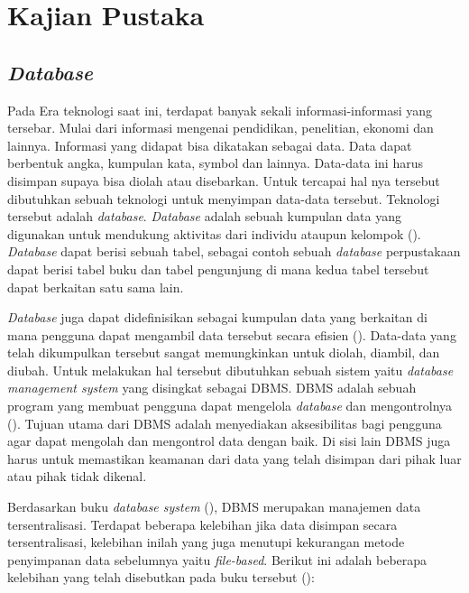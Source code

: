 
\chapter{Kajian Pustaka}

\section{\emph{Database}}

Pada Era teknologi saat ini, terdapat banyak sekali informasi-informasi 
yang tersebar. Mulai dari informasi mengenai pendidikan, penelitian, 
ekonomi dan lainnya. Informasi yang didapat bisa dikatakan sebagai data. 
Data dapat berbentuk angka, kumpulan kata, symbol dan lainnya. Data-data 
ini harus disimpan supaya bisa diolah atau disebarkan.  Untuk tercapai 
hal nya tersebut dibutuhkan sebuah teknologi untuk menyimpan data-data 
tersebut. Teknologi tersebut adalah \emph{database}. \emph{Database} adalah sebuah 
kumpulan data yang digunakan untuk mendukung aktivitas dari individu 
ataupun kelompok (\cite{databasedesignwatt}). \emph{Database} dapat berisi 
sebuah tabel, sebagai contoh sebuah \emph{database} perpustakaan dapat berisi 
tabel buku dan tabel pengunjung di mana kedua tabel tersebut dapat 
berkaitan satu sama lain. 

\emph{Database} juga dapat didefinisikan sebagai kumpulan data yang berkaitan 
di mana pengguna dapat mengambil data tersebut secara efisien 
(\cite{introductiondatabase}). Data-data yang telah dikumpulkan tersebut
sangat memungkinkan untuk diolah, diambil, dan diubah. Untuk melakukan 
hal tersebut dibutuhkan sebuah sistem yaitu \emph{database management 
system} yang disingkat sebagai DBMS. DBMS adalah sebuah program yang 
membuat pengguna dapat mengelola \emph{database} dan mengontrolnya 
(\cite{databasedesignwatt}). Tujuan utama dari DBMS adalah menyediakan 
aksesibilitas bagi pengguna agar dapat mengolah dan mengontrol 
data dengan baik. Di sisi lain DBMS juga harus untuk memastikan 
keamanan dari data yang telah disimpan dari pihak luar atau pihak 
tidak dikenal.

Berdasarkan buku \emph{database system}  (\cite{introductiondatabase}), DBMS merupakan manajemen data 
tersentralisasi. Terdapat beberapa kelebihan jika data disimpan secara tersentralisasi, kelebihan 
inilah yang juga menutupi kekurangan metode penyimpanan data sebelumnya yaitu \emph{file-based}. 
Berikut ini adalah beberapa kelebihan yang telah 
disebutkan pada buku tersebut (\cite{introductiondatabase}):

